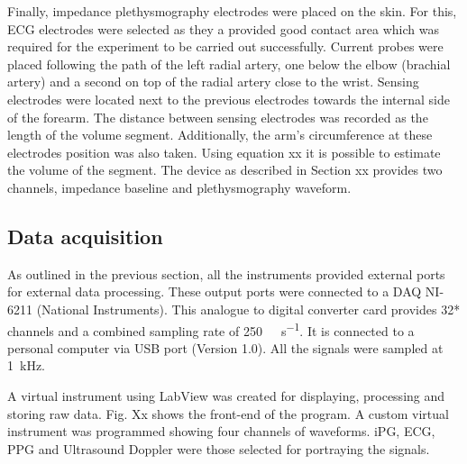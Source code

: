 
Finally, impedance plethysmography electrodes were placed on the skin. For this, ECG electrodes were selected as they a provided good contact area which was required for the experiment to be carried out successfully. Current probes were placed following the path of the left radial artery, one below the elbow (brachial artery) and a second on top of the radial artery close to the wrist. Sensing electrodes were located next to the previous electrodes towards the internal side of the forearm. The distance between sensing electrodes was recorded as the length of the volume segment. Additionally, the arm's circumference at these electrodes position was also taken. Using equation xx it is possible to estimate the volume of the segment.  The device as described in Section xx provides two channels, impedance baseline and plethysmography waveform. 




\subsection{Data acquisition}
\label{section procedure 1.2}

As outlined in the previous section, all the instruments provided external ports for external data processing. These output ports were connected to a DAQ NI-6211 (National Instruments). This analogue to digital converter card provides 32* channels and a combined sampling rate of \SI{250}{\kilo\sample\per\second}. It is connected to a personal computer via USB port (Version 1.0). All the signals were sampled at \SI{1}{\kilo\hertz}.


A virtual instrument using LabView was created for displaying, processing and storing raw data. Fig. Xx shows the front-end of the program. A custom virtual instrument was programmed showing four channels of waveforms. iPG, ECG, PPG and Ultrasound Doppler were those selected for portraying the signals.


